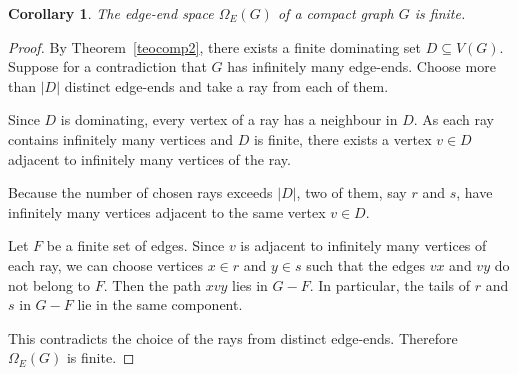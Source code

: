 \documentclass[10pt,a4paper]{amsart}
\newtheorem{corollary}{Corollary}
\begin{document}
\begin{corollary}
	\label{edge}
	The edge-end space $\Omega_E(G)$ of a compact graph $G$ is finite.
\end{corollary}

\begin{proof}
	By Theorem~\ref{teocomp2}, there exists a finite dominating set
	$D\subseteq V(G)$. Suppose for a contradiction that $G$ has infinitely
	many edge-ends. Choose more than $|D|$ distinct edge-ends and take a
	ray from each of them.
	
	Since $D$ is dominating, every vertex of a ray has a neighbour in $D$.
	As each ray contains infinitely many vertices and $D$ is finite, there
	exists a vertex $v\in D$ adjacent to infinitely many vertices of the ray.
	
	Because the number of chosen rays exceeds $|D|$, two of them,
	say $r$ and $s$, have infinitely many vertices adjacent to the
	same vertex $v\in D$.
	
	Let $F$ be a finite set of edges. Since $v$ is adjacent to infinitely
	many vertices of each ray, we can choose vertices $x\in r$ and
	$y\in s$ such that the edges $vx$ and $vy$ do not belong to $F$.
	Then the path $xvy$ lies in $G-F$. In particular, the tails of
	$r$ and $s$ in $G-F$ lie in the same component.
	
	This contradicts the choice of the rays from distinct edge-ends.
	Therefore $\Omega_E(G)$ is finite.
\end{proof}
\end{document}
